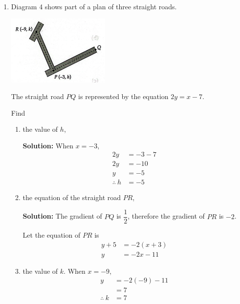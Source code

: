 \documentclass{report}
\newcommand{\sol}{\textbf{Solution:}}
\begin{document}
\begin{enumerate}[leftmargin=*]
    \item Diagram 4 shows part of a plan of three straight roads.
          \begin{center}
              \includegraphics[width=0.4\textwidth]{./assets/p1.10.png}
          \end{center}

          The straight road $P Q$ is represented by the equation $2 y=x-7$.

          Find
          \begin{enumerate}
              \item the value of $h$,

                    \sol{}
                    When $x = -3$,
                    \begin{align*}
                        2y            & = -3 - 7 \\
                        2y            & = -10    \\
                        y             & = -5     \\
                        \therefore\ h & = -5
                    \end{align*}

              \item the equation of the straight road $P R$,

                    \sol{}
                    The gradient of $P Q$ is $\dfrac{1}{2}$, therefore the gradient of $P R$ is $-2$.

                    Let the equation of $P R$ is
                    \begin{align*}
                        y + 5 & = -2(x + 3) \\
                        y     & = -2x - 11
                    \end{align*}

              \item the value of $k$. When $x = -9$,
                    \begin{align*}
                        y             & = -2(-9) - 11 \\
                                      & = 7           \\
                        \therefore\ k & = 7
                    \end{align*}
          \end{enumerate}


\end{enumerate}
\end{document}
